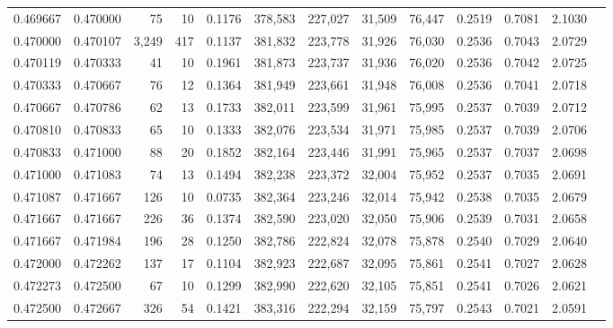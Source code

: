 \begin{tabular}{rrrrrrrrrrrrr}
0.469667 & 0.470000 &    75 &  10 &                                     0.1176 & 378,583 & 227,027 &  31,509 &  76,447 & 0.2519 & 0.7081 & 2.1030 \\
0.470000 & 0.470107 & 3,249 & 417 &                                     0.1137 & 381,832 & 223,778 &  31,926 &  76,030 & 0.2536 & 0.7043 & 2.0729 \\
0.470119 & 0.470333 &    41 &  10 &                                     0.1961 & 381,873 & 223,737 &  31,936 &  76,020 & 0.2536 & 0.7042 & 2.0725 \\
0.470333 & 0.470667 &    76 &  12 &                                     0.1364 & 381,949 & 223,661 &  31,948 &  76,008 & 0.2536 & 0.7041 & 2.0718 \\
0.470667 & 0.470786 &    62 &  13 &                                     0.1733 & 382,011 & 223,599 &  31,961 &  75,995 & 0.2537 & 0.7039 & 2.0712 \\
0.470810 & 0.470833 &    65 &  10 &                                     0.1333 & 382,076 & 223,534 &  31,971 &  75,985 & 0.2537 & 0.7039 & 2.0706 \\
0.470833 & 0.471000 &    88 &  20 &                                     0.1852 & 382,164 & 223,446 &  31,991 &  75,965 & 0.2537 & 0.7037 & 2.0698 \\
0.471000 & 0.471083 &    74 &  13 &                                     0.1494 & 382,238 & 223,372 &  32,004 &  75,952 & 0.2537 & 0.7035 & 2.0691 \\
0.471087 & 0.471667 &   126 &  10 &                                     0.0735 & 382,364 & 223,246 &  32,014 &  75,942 & 0.2538 & 0.7035 & 2.0679 \\
0.471667 & 0.471667 &   226 &  36 &                                     0.1374 & 382,590 & 223,020 &  32,050 &  75,906 & 0.2539 & 0.7031 & 2.0658 \\
0.471667 & 0.471984 &   196 &  28 &                                     0.1250 & 382,786 & 222,824 &  32,078 &  75,878 & 0.2540 & 0.7029 & 2.0640 \\
0.472000 & 0.472262 &   137 &  17 &                                     0.1104 & 382,923 & 222,687 &  32,095 &  75,861 & 0.2541 & 0.7027 & 2.0628 \\
0.472273 & 0.472500 &    67 &  10 &                                     0.1299 & 382,990 & 222,620 &  32,105 &  75,851 & 0.2541 & 0.7026 & 2.0621 \\
0.472500 & 0.472667 &   326 &  54 &                                     0.1421 & 383,316 & 222,294 &  32,159 &  75,797 & 0.2543 & 0.7021 & 2.0591 \\

\end{tabular}
